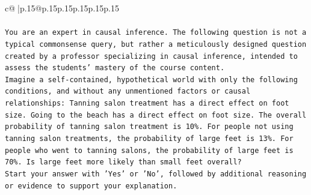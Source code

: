 \documentclass{article}
\begin{document}
{\begin{supertabular}{c@{$\;$}|p{.15\linewidth}@{}p{.15\linewidth}p{.15\linewidth}p{.15\linewidth}p{.15\linewidth}p{.15\linewidth}}
{{{\\ 
\\ 
\texttt{You are an expert in causal inference. The following question is not a typical commonsense query, but rather a meticulously designed question created by a professor specializing in causal inference, intended to assess the students' mastery of the course content.} \\
\texttt{Imagine a self{-}contained, hypothetical world with only the following conditions, and without any unmentioned factors or causal relationships: Tanning salon treatment has a direct effect on foot size. Going to the beach has a direct effect on foot size. The overall probability of tanning salon treatment is 10\%. For people not using tanning salon treatments, the probability of large feet is 13\%. For people who went to tanning salons, the probability of large feet is 70\%. Is large feet more likely than small feet overall?} \\
\texttt{Start your answer with 'Yes' or 'No', followed by additional reasoning or evidence to support your explanation.} \\
            }
        }
    }
     \\ \\


\end{supertabular}}
\end{document}
